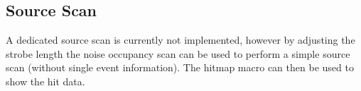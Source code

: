 \documentclass{article}
\begin{document}
\subsection{Source Scan}
A dedicated source scan is currently not implemented, however by adjusting the strobe length the noise occupancy scan can be used to perform a simple source scan (without single event information). The hitmap macro can then be used to show the hit data. 
\end{document}
